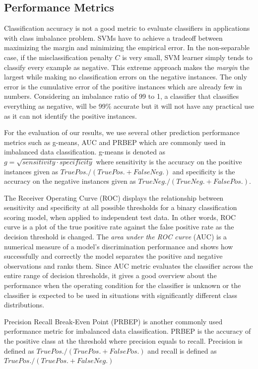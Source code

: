 \subsection{Performance Metrics}
Classification accuracy is not a good metric to evaluate classifiers in applications with class imbalance problem.  SVMs have to achieve a tradeoff between maximizing the margin and minimizing the empirical error. In the non-separable case, if the misclassification penalty $C$ is very small, SVM learner simply tends to classify every example as negative. This extreme approach makes the \textit{margin} the largest while making no classification errors on the negative instances. The only error is the cumulative error of the positive instances which are already few in numbers. Considering an imbalance ratio of 99 to 1, a classifier that classifies everything as negative, will be 99\% accurate but it will not have any practical use as it can not identify the positive instances.

For the evaluation of our results, we use several other prediction performance metrics such as g-means, AUC and PRBEP which are commonly used in imbalanced data classification. g-means \cite{Kubat_1997} is denoted as $g=\sqrt{sensitivity \cdot specificity}$ where sensitivity is the accuracy on the positive instances given as $True Pos./(True Pos.+False Neg.)$ and specificity is the accuracy on the negative instances given as $True Neg./(True Neg.+False Pos.)$.

The Receiver Operating Curve (ROC) displays the relationship between sensitivity and specificity at all possible thresholds for a binary classification scoring model, when applied to independent test data. In other words, ROC curve is a plot of the true positive rate against the false positive rate as the decision threshold is changed. The \textit{area under the ROC curve} (AUC) is a numerical measure of a model's discrimination performance and shows how successfully and correctly the model separates the positive and negative observations and ranks them. Since AUC metric evaluates the classifier across the entire range of decision thresholds, it gives a good overview about the performance when the operating condition for the classifier is unknown or the classifier is expected to be used in situations with significantly different class distributions.

Precision Recall Break-Even Point (PRBEP) is another commonly used performance metric for imbalanced data classification. PRBEP is the accuracy of the positive class at the threshold where precision equals to recall. Precision is defined as $True Pos./(True Pos.+False Pos.)$ and recall is defined as $True Pos./(True Pos.+False Neg.)$


